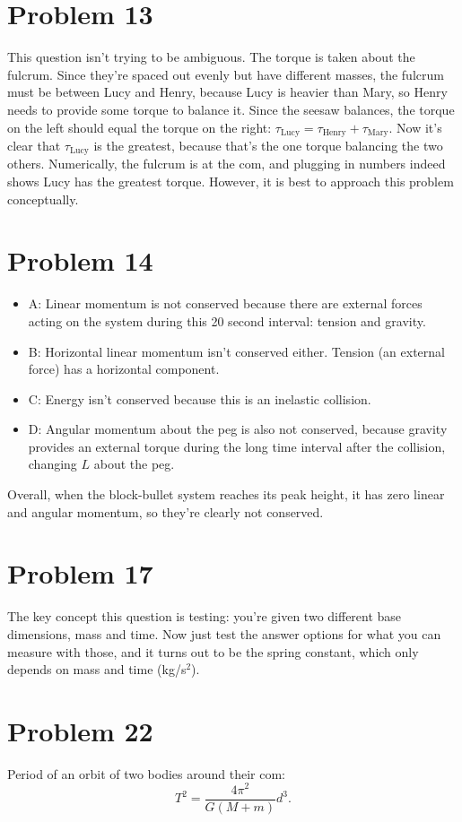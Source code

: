 \documentclass[11pt]{article}
\begin{document}
\section*{Problem 13}
This question isn't trying to be ambiguous. The torque is taken about the fulcrum. Since they're spaced out evenly but have different masses, the fulcrum must be between Lucy and Henry, because Lucy is heavier than Mary, so Henry needs to provide some torque to balance it.
Since the seesaw balances, the torque on the left should equal the torque on the right: $\tau_{\text{Lucy}}=\tau_{\text{Henry}}+\tau_{\text{Mary}}$. Now it's clear that $\tau_{\text{Lucy}}$ is the greatest, because that's the one torque balancing the two others.
Numerically, the fulcrum is at the com, and plugging in numbers indeed shows Lucy has the greatest torque. However, it is best to approach this problem conceptually.

\section*{Problem 14}
\begin{itemize}[leftmargin=*, itemsep=0.25em]
\item A: Linear momentum is not conserved because there are external forces acting on the system during this 20 second interval: tension and gravity.
\item B: Horizontal linear momentum isn't conserved either. Tension (an external force) has a horizontal component.
\item C: Energy isn't conserved because this is an inelastic collision.
\item D: Angular momentum about the peg is also not conserved, because gravity provides an external torque during the long time interval after the collision, changing $L$ about the peg.
\end{itemize}
Overall, when the block-bullet system reaches its peak height, it has zero linear and angular momentum, so they're clearly not conserved.

\section*{Problem 17}
The key concept this question is testing: you're given two different base dimensions, mass and time.
Now just test the answer options for what you can measure with those, and it turns out to be the spring constant, which only depends on mass and time (kg/s$^2$).

\section*{Problem 22}
Period of an orbit of two bodies around their com:
\[
T^2=\frac{4\pi^2}{G(M+m)}d^3.
\]
\end{document}
